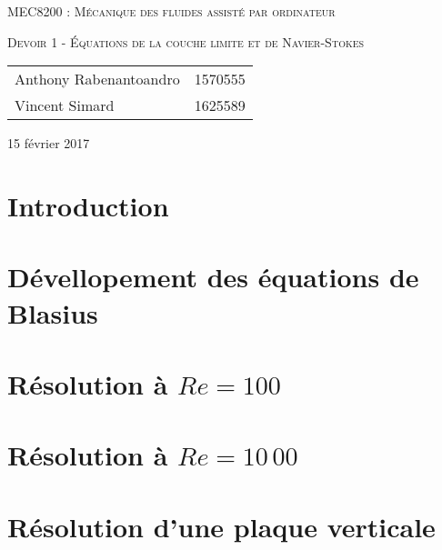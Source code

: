 \documentclass[12pt, letterpaper]{article}
\begin{document}
\begin{titlepage}
	\centering
    {\scshape\Large
	MEC8200 : Mécanique  des fluides assisté par ordinateur \par
    }
    \vspace{4cm}
    {\scshape\LARGE
	Devoir 1 - Équations de la couche limite et de Navier-Stokes \par
	}
    \vspace{4cm}
    {\Large
	\begin{tabular}{ll}
		Anthony Rabenantoandro & 1570555 \\
		Vincent Simard & 1625589 \\
	\end{tabular}
	}
    \vfill
    {\Large
    15 février 2017
    }
\end{titlepage}
\newpage
\tableofcontents
\listoffigures
\listoftables
\newpage


\section{Introduction}
	
\section{Dévellopement des équations de Blasius}
	
\section{Résolution à $Re=100$}
	
\section{Résolution à $Re=10\,00$}
	
\section{Résolution d'une plaque verticale}
		
\end{document}
